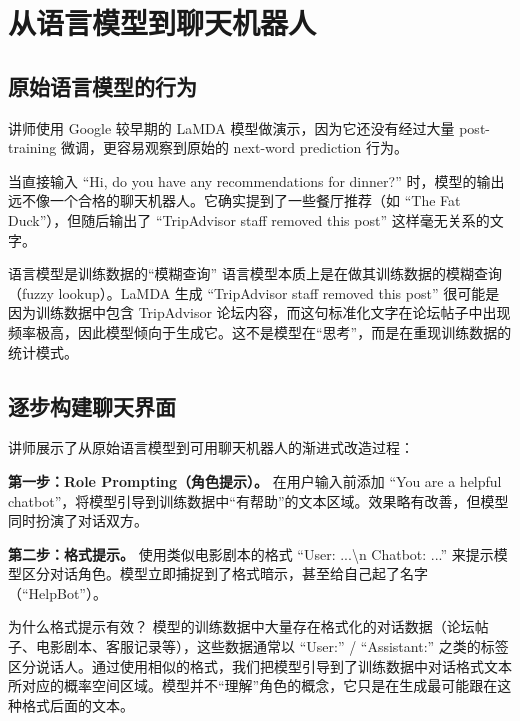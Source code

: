 \section{从语言模型到聊天机器人}

\subsection{原始语言模型的行为}

讲师使用 Google 较早期的 LaMDA 模型做演示，因为它还没有经过大量 post-training 微调，更容易观察到原始的 next-word prediction 行为。

当直接输入 ``Hi, do you have any recommendations for dinner?'' 时，模型的输出远不像一个合格的聊天机器人。它确实提到了一些餐厅推荐（如 ``The Fat Duck''），但随后输出了 ``TripAdvisor staff removed this post'' 这样毫无关系的文字。

\begin{importantbox}{语言模型是训练数据的``模糊查询''}
语言模型本质上是在做其训练数据的模糊查询（fuzzy lookup）。LaMDA 生成 ``TripAdvisor staff removed this post'' 很可能是因为训练数据中包含 TripAdvisor 论坛内容，而这句标准化文字在论坛帖子中出现频率极高，因此模型倾向于生成它。这不是模型在``思考''，而是在重现训练数据的统计模式。
\end{importantbox}

\subsection{逐步构建聊天界面}

讲师展示了从原始语言模型到可用聊天机器人的渐进式改造过程：

\textbf{第一步：Role Prompting（角色提示）。} 在用户输入前添加 ``You are a helpful chatbot''，将模型引导到训练数据中``有帮助''的文本区域。效果略有改善，但模型同时扮演了对话双方。

\textbf{第二步：格式提示。} 使用类似电影剧本的格式 ``User: ...\textbackslash n Chatbot: ...'' 来提示模型区分对话角色。模型立即捕捉到了格式暗示，甚至给自己起了名字（``HelpBot''）。

\begin{knowledgebox}{为什么格式提示有效？}
模型的训练数据中大量存在格式化的对话数据（论坛帖子、电影剧本、客服记录等），这些数据通常以 ``User:'' / ``Assistant:'' 之类的标签区分说话人。通过使用相似的格式，我们把模型引导到了训练数据中对话格式文本所对应的概率空间区域。模型并不``理解''角色的概念，它只是在生成最可能跟在这种格式后面的文本。
\end{knowledgebox}


